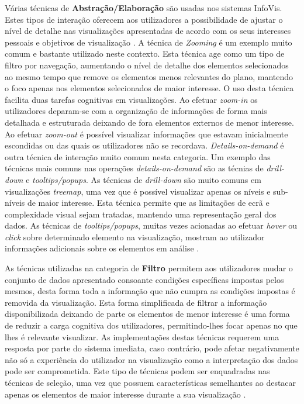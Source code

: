 Várias técnicas de \textbf{Abstração/Elaboração} são usadas nos sistemas \gls{InfoVis}. Estes tipos de interação oferecem aos utilizadores a possibilidade de ajustar o nível de detalhe nas visualizações apresentadas de acordo com os seus interesses pessoais e objetivos de visualização \cite{yi2007toward, figueiras2015towards}. A técnica de \textit{Zooming} é um exemplo muito comum e bastante utilizado neste contexto. Esta técnica age como um tipo de filtro por navegação, aumentando o nível de detalhe dos elementos selecionados ao mesmo tempo que remove os elementos menos relevantes do plano, mantendo o foco apenas nos elementos selecionados de maior interesse. O uso desta técnica facilita duas tarefas cognitivas em visualizações. Ao efetuar \textit{zoom-in} os utilizadores deparam-se com a organização de informações de forma mais detalhada e estruturada deixando de fora elementos externos de menor interesse. Ao efetuar \textit{zoom-out} é possível visualizar informações que estavam inicialmente escondidas ou das quais os utilizadores não se recordava. \textit{Details-on-demand} é outra técnica de interação muito comum nesta categoria. Um exemplo das técnicas mais comuns nas operações \textit{details-on-demand} são as técnias de \textit{drill-down} e \textit{tooltips/popups}. As técnicas de \textit{drill-down} são muito comuns em visualizações \textit{treemap}, uma vez que é possível visualizar apenas os níveis e sub-níveis de maior interesse. Esta técnica permite que as limitações de ecrã e complexidade visual sejam tratadas, mantendo uma representação geral dos dados. As técnicas de \textit{tooltips/popups}, muitas vezes acionadas ao efetuar \textit{hover} ou \textit{click} sobre determinado elemento na visualização, mostram ao utilizador informações adicionais sobre os elementos em análise \cite{figueiras2015towards}.

As técnicas utilizadas na categoria de \textbf{Filtro} permitem aos utilizadores mudar o conjunto de dados apresentado consoante condições específicas impostas pelos mesmos, desta forma toda a informação que não cumpra as condições impostas é removida da visualização. Esta forma simplificada de filtrar a informação disponibilizada deixando de parte os elementos de menor interesse é uma forma de reduzir a carga cognitiva dos utilizadores, permitindo-lhes focar apenas no que lhes é relevante visualizar. As implementações destas técnicas requerem uma resposta por parte do sistema imediata, caso contrário, pode afetar negativamente não só a experiência do utilizador na visualização como a interpretação dos dados pode ser comprometida. Este tipo de técnicas podem ser enquadradas nas técnicas de seleção, uma vez que possuem características semelhantes ao destacar apenas os elementos de maior interesse durante a sua visualização \cite{figueiras2015towards, yi2007toward}.

